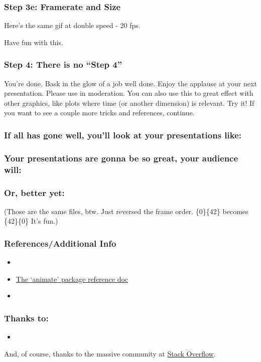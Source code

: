 \documentclass{beamer}
\begin{document}
\begin{frame}
	\frametitle{Step 3e: Framerate and Size}
	Here's the same gif at double speed - 20 fps.
		\begin{center}
		\end{center}
	Have fun with this.
\end{frame}

\begin{frame}
	\frametitle{Step 4: There is no ``Step 4''}
	You're done. Bask in the glow of a job well done. Enjoy the applause at your next presentation. Please use in moderation. You can also use this to great effect with other graphics, like plots where time (or another dimension) is relevant. Try it! If you want to see a couple more tricks and references, continue.
\end{frame}

\begin{frame}
	\frametitle{If all has gone well, you'll look at your presentations like:}
	\begin{center}
	\end{center}
\end{frame}

\begin{frame}
	\frametitle{Your presentations are gonna be so great, your audience will:}
	\begin{center}
	\end{center}
\end{frame}

\begin{frame}
	\frametitle{Or, better yet:}
	\begin{center}
	\end{center}
	\pause
(Those are the same files, btw. Just reversed the frame order. \{0\}\{42\} becomes \{42\}\{0\} It's fun.)
\end{frame}

\begin{frame}
	\frametitle{References/Additional Info}
	
		\begin{itemize}
			\item \
			\item \href{http://tug.ctan.org/macros/latex/contrib/animate/animate.pdf}{The `animate' package reference doc}
			\item
		\end{itemize}
	
\end{frame}

\begin{frame}
	\frametitle{Thanks to:}
	\begin{itemize}
		\item 
	\end{itemize}
	And, of course, thanks to the massive community at \href{http://stackoverflow.com/}{Stack Overflow}.
\end{frame}
\end{document}
